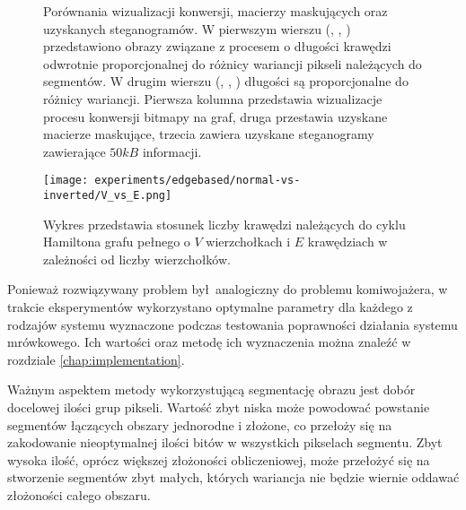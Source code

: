 {{{\begin{figure}
                \caption[Porównania wizualizacji konwersji oraz macierzy maskujących.]
                {Porównania wizualizacji konwersji, macierzy maskujących oraz uzyskanych steganogramów. W pierwszym
                    wierszu (, , )
                    przedstawiono obrazy związane z procesem o długości krawędzi odwrotnie proporcjonalnej do różnicy
                    wariancji pikseli należących do segmentów. W drugim wierszu (,
                    , ) długości są proporcjonalne do
                    różnicy wariancji. Pierwsza kolumna przedstawia wizualizacje procesu konwersji bitmapy na graf,
                    druga przestawia uzyskane macierze maskujące, trzecia zawiera uzyskane steganogramy zawierające
                    $50kB$ informacji.}
                \label{fig:exp-edge}
            \end{figure}

            \begin{figure}
                \center
                \texttt{[image: experiments/edgebased/normal-vs-inverted/V\_vs\_E.png]}
                \caption
                {Wykres przedstawia stosunek liczby krawędzi należących do cyklu Hamiltona grafu pełnego o $V$
                    wierzchołkach i $E$ krawędziach w zależności od liczby wierzchołków.}
                \label{fig:exp-edge-v-vs-e}
            \end{figure}

            Ponieważ rozwiązywany problem był analogiczny do problemu komiwojażera, w trakcie eksperymentów wykorzystano
            optymalne parametry dla każdego z rodzajów systemu wyznaczone podczas testowania poprawności działania
            systemu mrówkowego. Ich wartości oraz metodę ich wyznaczenia można znaleźć w rozdziale
            \ref{chap:implementation}.

            Ważnym aspektem metody wykorzystującą segmentację obrazu jest dobór docelowej ilości grup pikseli. Wartość
            zbyt niska może powodować powstanie segmentów łączących obszary jednorodne i złożone, co przełoży się na
            zakodowanie nieoptymalnej ilości bitów w wszystkich pikselach segmentu. Zbyt wysoka ilość, oprócz większej
            złożoności obliczeniowej, może przełożyć się na stworzenie segmentów zbyt małych, których wariancja nie
            będzie wiernie oddawać złożoności całego obszaru.

}}}
